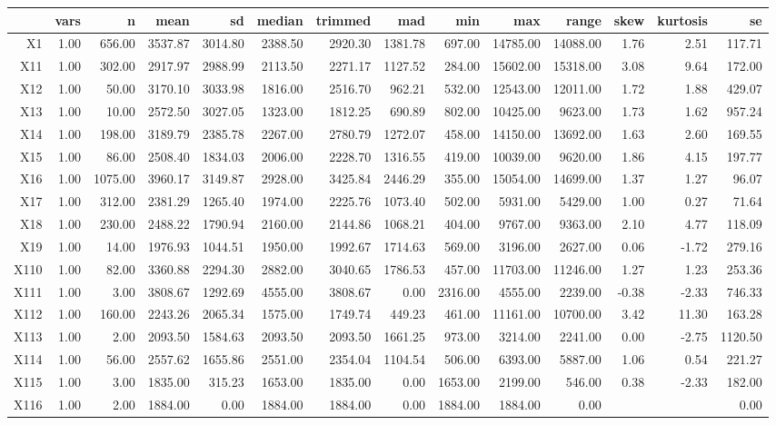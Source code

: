 % 
\begin{tabular}{rrrrrrrrrrrrrr}
  \hline
 & vars & n & mean & sd & median & trimmed & mad & min & max & range & skew & kurtosis & se \\ 
  \hline
X1 & 1.00 & 656.00 & 3537.87 & 3014.80 & 2388.50 & 2920.30 & 1381.78 & 697.00 & 14785.00 & 14088.00 & 1.76 & 2.51 & 117.71 \\ 
  X11 & 1.00 & 302.00 & 2917.97 & 2988.99 & 2113.50 & 2271.17 & 1127.52 & 284.00 & 15602.00 & 15318.00 & 3.08 & 9.64 & 172.00 \\ 
  X12 & 1.00 & 50.00 & 3170.10 & 3033.98 & 1816.00 & 2516.70 & 962.21 & 532.00 & 12543.00 & 12011.00 & 1.72 & 1.88 & 429.07 \\ 
  X13 & 1.00 & 10.00 & 2572.50 & 3027.05 & 1323.00 & 1812.25 & 690.89 & 802.00 & 10425.00 & 9623.00 & 1.73 & 1.62 & 957.24 \\ 
  X14 & 1.00 & 198.00 & 3189.79 & 2385.78 & 2267.00 & 2780.79 & 1272.07 & 458.00 & 14150.00 & 13692.00 & 1.63 & 2.60 & 169.55 \\ 
  X15 & 1.00 & 86.00 & 2508.40 & 1834.03 & 2006.00 & 2228.70 & 1316.55 & 419.00 & 10039.00 & 9620.00 & 1.86 & 4.15 & 197.77 \\ 
  X16 & 1.00 & 1075.00 & 3960.17 & 3149.87 & 2928.00 & 3425.84 & 2446.29 & 355.00 & 15054.00 & 14699.00 & 1.37 & 1.27 & 96.07 \\ 
  X17 & 1.00 & 312.00 & 2381.29 & 1265.40 & 1974.00 & 2225.76 & 1073.40 & 502.00 & 5931.00 & 5429.00 & 1.00 & 0.27 & 71.64 \\ 
  X18 & 1.00 & 230.00 & 2488.22 & 1790.94 & 2160.00 & 2144.86 & 1068.21 & 404.00 & 9767.00 & 9363.00 & 2.10 & 4.77 & 118.09 \\ 
  X19 & 1.00 & 14.00 & 1976.93 & 1044.51 & 1950.00 & 1992.67 & 1714.63 & 569.00 & 3196.00 & 2627.00 & 0.06 & -1.72 & 279.16 \\ 
  X110 & 1.00 & 82.00 & 3360.88 & 2294.30 & 2882.00 & 3040.65 & 1786.53 & 457.00 & 11703.00 & 11246.00 & 1.27 & 1.23 & 253.36 \\ 
  X111 & 1.00 & 3.00 & 3808.67 & 1292.69 & 4555.00 & 3808.67 & 0.00 & 2316.00 & 4555.00 & 2239.00 & -0.38 & -2.33 & 746.33 \\ 
  X112 & 1.00 & 160.00 & 2243.26 & 2065.34 & 1575.00 & 1749.74 & 449.23 & 461.00 & 11161.00 & 10700.00 & 3.42 & 11.30 & 163.28 \\ 
  X113 & 1.00 & 2.00 & 2093.50 & 1584.63 & 2093.50 & 2093.50 & 1661.25 & 973.00 & 3214.00 & 2241.00 & 0.00 & -2.75 & 1120.50 \\ 
  X114 & 1.00 & 56.00 & 2557.62 & 1655.86 & 2551.00 & 2354.04 & 1104.54 & 506.00 & 6393.00 & 5887.00 & 1.06 & 0.54 & 221.27 \\ 
  X115 & 1.00 & 3.00 & 1835.00 & 315.23 & 1653.00 & 1835.00 & 0.00 & 1653.00 & 2199.00 & 546.00 & 0.38 & -2.33 & 182.00 \\ 
  X116 & 1.00 & 2.00 & 1884.00 & 0.00 & 1884.00 & 1884.00 & 0.00 & 1884.00 & 1884.00 & 0.00 &  &  & 0.00 \\ 
   \hline
\end{tabular}

